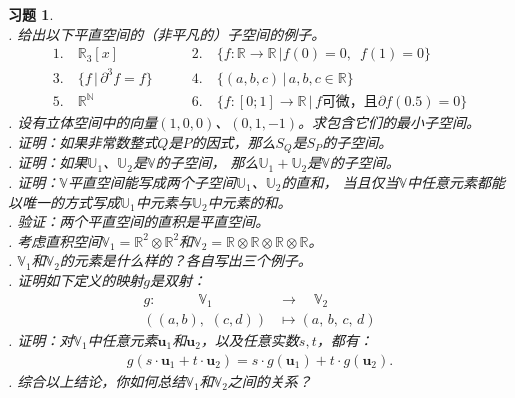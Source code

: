 \documentclass[12pt,UTF8]{ctexbook}
\theoremstyle{definition}
\theoremstyle{plain}
\newtheorem{xt}{习题}[section]
\begin{document}
\begin{xt}
    \mbox{} \\
    . 给出以下平直空间的（非平凡的）子空间的例子。
    $$
    \begin{array}{ll}
        1. \quad \mathbb{R}_3[x] & \qquad 2. \quad \{f: \mathbb{R} \rightarrow \mathbb{R} \, | f(0) = 0, \,\,\, f(1) = 0\} \\
        3. \quad \{f \, | \, \partial^3 f = f\} & \qquad 4. \quad \{(a, b, c) \, | \, a, b, c \in \mathbb{R}\} \\
        5. \quad \mathbb{R}^\mathbb{N} & \qquad 6. \quad \{f: [0;1] \rightarrow \mathbb{R} \, | \, f \mbox{可微，且} \partial f(0.5) = 0\}
    \end{array}
    $$
    . 设有立体空间中的向量$(1, 0, 0)$、$(0, 1, -1)$。求包含它们的最小子空间。\\
    . 证明：如果非常数整式$Q$是$P$的因式，那么$S_Q$是$S_P$的子空间。\\
    . 证明：如果$\mathbb{U}_1$、$\mathbb{U}_2$是$\mathbb{V}$的子空间，
    那么$\mathbb{U}_1 + \mathbb{U}_2$是$\mathbb{V}$的子空间。\\
    . 证明：$\mathbb{V}$平直空间能写成两个子空间$\mathbb{U}_1$、$\mathbb{U}_2$的直和，
    当且仅当$\mathbb{V}$中任意元素都能以唯一的方式写成$\mathbb{U}_1$中元素与$\mathbb{U}_2$中元素的和。\\
    . 验证：两个平直空间的直积是平直空间。\\
    . 考虑直积空间$\mathbb{V}_1 = \mathbb{R}^2\otimes \mathbb{R}^2$和$\mathbb{V}_2 = \mathbb{R}\otimes \mathbb{R}\otimes \mathbb{R}\otimes \mathbb{R}$。\\
    . $\mathbb{V}_1$和$\mathbb{V}_2$的元素是什么样的？各自写出三个例子。\\
    . 证明如下定义的映射$g$是双射：
    \begin{align*}
        g:\quad \qquad \mathbb{V}_1 \qquad &\rightarrow \quad \mathbb{V}_2 \\
        ((a,b), \,\, (c,d)) &\mapsto (a, \,b, \,c, \,d)
    \end{align*}
    . 证明：对$\mathbb{V}_1$中任意元素$\mathbf{u}_1$和$\mathbf{u}_2$，以及任意实数$s, t$，都有：
    \begin{align*}
        g(s\cdot \mathbf{u}_1 + t\cdot \mathbf{u}_2) = s\cdot g(\mathbf{u}_1) + t\cdot g(\mathbf{u}_2).
    \end{align*}
    . 综合以上结论，你如何总结$\mathbb{V}_1$和$\mathbb{V}_2$之间的关系？\\
\end{xt}
\end{document}
